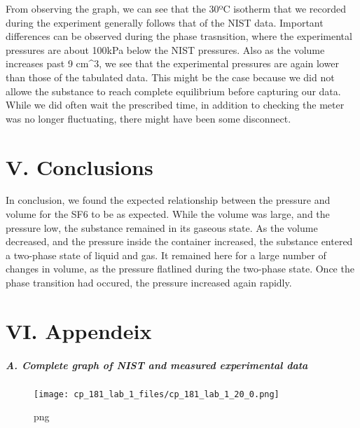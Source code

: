 From observing the graph, we can see that the 30ºC isotherm that we
recorded during the experiment generally follows that of the NIST data.
Important differences can be observed during the phase trasnsition,
where the experimental pressures are about 100kPa below the NIST
pressures. Also as the volume increases past 9 cm\^{}3, we see that the
experimental pressures are again lower than those of the tabulated data.
This might be the case because we did not allowe the substance to reach
complete equilibrium before capturing our data. While we did often wait
the prescribed time, in addition to checking the meter was no longer
fluctuating, there might have been some disconnect.

\hypertarget{v.-conclusions}{%
\section{V. Conclusions}\label{v.-conclusions}}

In conclusion, we found the expected relationship between the pressure
and volume for the SF6 to be as expected. While the volume was large,
and the pressure low, the substance remained in its gaseous state. As
the volume decreased, and the pressure inside the container increased,
the substance entered a two-phase state of liquid and gas. It remained
here for a large number of changes in volume, as the pressure flatlined
during the two-phase state. Once the phase transition had occured, the
pressure increased again rapidly.

\hypertarget{vi.-appendeix}{%
\section{VI. Appendeix}\label{vi.-appendeix}}

\hypertarget{a.-complete-graph-of-nist-and-measured-experimental-data}{%
\subparagraph{A. Complete graph of NIST and measured experimental
data}\label{a.-complete-graph-of-nist-and-measured-experimental-data}}

\begin{Shaded}
\begin{Highlighting}[]
\end{Highlighting}
\end{Shaded}

\begin{figure}
\centering
\texttt{[image: cp\_181\_lab\_1\_files/cp\_181\_lab\_1\_20\_0.png]}
\caption{png}
\end{figure}

